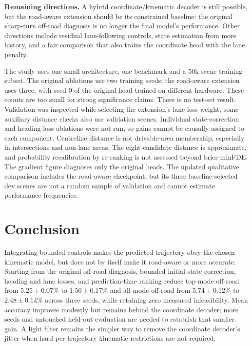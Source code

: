 \documentclass[conference]{IEEEtran}
\begin{document}
\textbf{Remaining directions.} A hybrid coordinate/kinematic decoder is still possible, but the
road-aware extension should be its constrained baseline: the original sharp-turn off-road diagnosis
is no longer the final model's performance. Other directions include residual lane-following
controls, state estimation from more history, and a fair comparison that also trains the coordinate
head with the lane penalty.

The study uses one small architecture, one benchmark and a 50k-scene training subset. The original
ablations use two training seeds; the road-aware extension uses three, with seed 0 of the original
head trained on different hardware. These counts are too small for strong significance claims.
There is no test-set result. Validation was inspected while selecting the extension's lane-loss
weight; some auxiliary distance checks also use validation scenes. Individual state-correction and
heading-loss ablations were not run, so gains cannot be causally assigned to each component.
Centreline distance is not drivable-area membership, especially in intersections and non-lane
areas. The eight-candidate distance is approximate, and probability recalibration by re-ranking is
not assessed beyond brier-minFDE. The gradient figure diagnoses only the original heads. The updated qualitative comparison
includes the road-aware checkpoint, but its three baseline-selected dev scenes are not a random
sample of validation and cannot estimate performance frequencies.

\section{Conclusion}

Integrating bounded controls makes the predicted trajectory obey the chosen kinematic model, but
does not by itself make it road-aware or more accurate. Starting from the original off-road
diagnosis, bounded initial-state correction, heading and lane losses, and prediction-time ranking
reduce top-mode off-road from $5.25\pm0.07\%$ to $1.50\pm0.17\%$ and all-mode off-road from
$5.74\pm0.12\%$ to $2.48\pm0.14\%$ across three seeds, while retaining zero measured infeasibility.
Mean accuracy improves modestly but remains behind the coordinate decoder; more seeds and untouched
held-out evaluation are needed to establish that smaller gain. A light filter remains the simpler
way to remove the coordinate decoder's jitter when hard per-trajectory kinematic restrictions are
not required.

\begingroup
{}
\raggedright
{}
\setlength{\emergencystretch}{1em}


\endgroup
\end{document}
